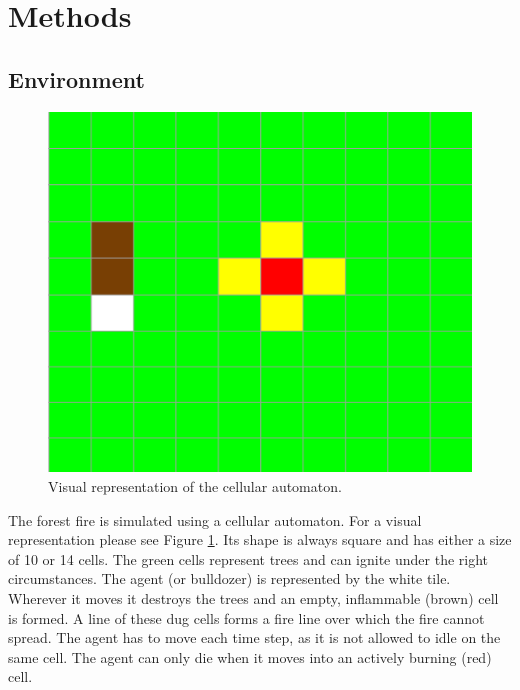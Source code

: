 
\section{Methods}\label{sec:methods}

\subsection{Environment}\label{sec:environment}
\begin{figure}[h]
    \centering
    \includegraphics[width=\linewidth]{img/simulation.png}
    \caption{Visual representation of the cellular automaton.}
    \label{fig:simulation}
\end{figure}
The forest fire is simulated using a cellular automaton. For a visual representation please see Figure \ref{fig:simulation}. Its shape is always square and has either a size of 10 or 14 cells. The green cells represent trees and can ignite under the right circumstances.
The agent (or bulldozer) is represented by the white tile. Wherever it moves it destroys the trees and an empty, inflammable (brown) cell is formed. A line of these dug cells forms a fire line over which the fire cannot spread. The agent has to move each time step, as it is not allowed to idle on the same cell. The agent can only die when it moves into an actively burning (red) cell.

